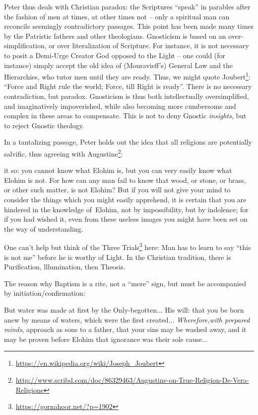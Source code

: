 Peter thus deals with Christian paradox: the Scriptures ``speak'' in parables after the fashion of men at times, at other times not -- only a spiritual man can reconcile seemingly contradictory passages. This point has been made many times by the Patristic fathers and other theologians. Gnosticism is based on an over-simplification, or over literalization of Scripture. For instance, it is not necessary to posit a Demi-Urge Creator God opposed to the Light -- one could (for instance) simply accept the old idea of (Mouravieff's) General Law and the Hierarchies, who tutor men until they are ready. Thus, we might quote Joubert\footnote{\url{https://en.wikipedia.org/wiki/Joseph\_Joubert}}: ``Force and Right rule the world; Force, till Right is ready''. There is no necessary contradiction, but paradox. Gnosticism is thus both intellectually oversimplified, and imaginatively impoverished, while also becoming more cumbersome and complex in these areas to compensate. This is not to deny Gnostic \emph{insights}, but to reject Gnostic theology.

In a tantalizing passage, Peter holds out the idea that all religions are potentially salvific, thus agreeing with Augustine\footnote{\url{http://www.scribd.com/doc/86329463/Augustine-on-True-Religion-De-Vera-Religione}}:

\begin{quotex}
it so: you cannot know what Elohim is, but you can very easily know what Elohim is not. For how can any man fail to know that wood, or stone, or brass, or other such matter, is not Elohim? But if you will not give your mind to consider the things which you might easily apprehend, it is certain that you are hindered in the knowledge of~Elohim, not by impossibility, but by indolence; for if you had wished it, even from these useless images you might have been set on the way of understanding.
\end{quotex}


One can't help but think of the Three Trials\footnote{\url{https://gornahoor.net/?p=1902}} here: Man has to learn to say ``this is not me'' before he is worthy of Light. In the Christian tradition, there is Purification, lllumination, then Theosis.

The reason why Baptism is a rite, not a ``mere'' sign, but must be accompanied by initiation/confirmation:

\begin{quotex}
But water was made at first by the Only-begotten... His will: that you be born anew by means of waters, which were the first created... \emph{Wherefore,with prepared minds}, approach as sons to a father, that your sins may be washed away, and it may be proven before Elohim that ignorance was their sole cause...
\end{quotex}


